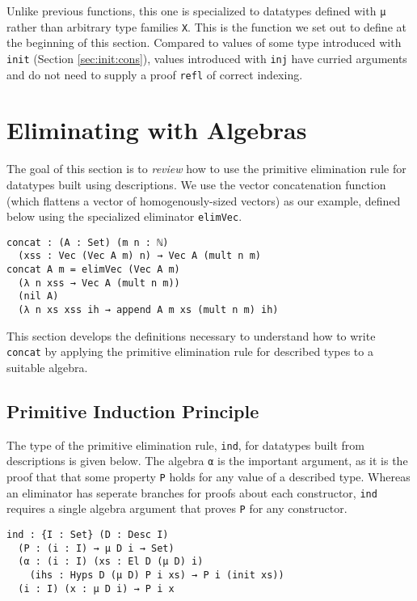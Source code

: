 \documentclass[preprint,nonatbib]{sigplanconf}
\newcommand{\refsec}[1]{Section \ref{sec:#1}}
\begin{document}
Unlike previous functions, this one is specialized to datatypes
defined with {\tt μ} rather than arbitrary type families {\tt X}. This
is the function we set out to define at the beginning of this section.
Compared to values of some type introduced with {\tt init} (\refsec{init:cons}),
values introduced with {\tt inj} have curried arguments and do not
need to supply a proof {\tt refl} of correct indexing.

\section{Eliminating with Algebras}
\label{sec:ind}

The goal of this section is to {\it review} how to use the primitive
elimination rule for datatypes built using descriptions. We use
the vector concatenation function (which flattens a vector of
homogenously-sized vectors) as our example, defined below using the
specialized eliminator {\tt elimVec}.

\begin{verbatim}
concat : (A : Set) (m n : ℕ)
  (xss : Vec (Vec A m) n) → Vec A (mult n m)
concat A m = elimVec (Vec A m)
  (λ n xss → Vec A (mult n m))
  (nil A)
  (λ n xs xss ih → append A m xs (mult n m) ih)
\end{verbatim}

This section develops the definitions necessary to understand how to
write {\tt concat} by applying the primitive elimination rule for
described types to a suitable algebra.

\subsection{Primitive Induction Principle}

The type of the primitive elimination rule, {\tt ind}, for datatypes built from
descriptions is given below.
The algebra {\tt α} is the important argument, as it is the proof that
that some property {\tt P} holds for any value of a
described type.
Whereas an eliminator
has seperate branches for proofs about each constructor, {\tt ind}
requires a single algebra argument that proves {\tt P} for any
constructor.

\begin{verbatim}
ind : {I : Set} (D : Desc I)
  (P : (i : I) → μ D i → Set)
  (α : (i : I) (xs : El D (μ D) i)
    (ihs : Hyps D (μ D) P i xs) → P i (init xs))
  (i : I) (x : μ D i) → P i x
\end{verbatim}
\end{document}
